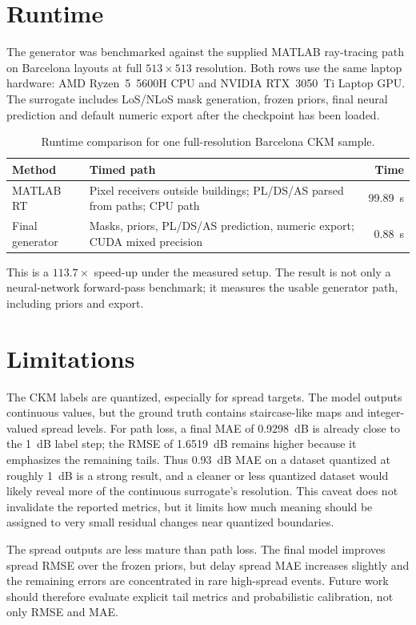\section{Runtime}

The generator was benchmarked against the supplied MATLAB ray-tracing path on
Barcelona layouts at full \(513\times513\) resolution. Both rows use the same
laptop hardware: AMD Ryzen~5~5600H CPU and NVIDIA RTX~3050~Ti Laptop GPU. The
surrogate includes LoS/NLoS mask generation, frozen priors, final neural
prediction and default numeric export after the checkpoint has been loaded.

\begin{table}[htbp]
\centering
\caption{Runtime comparison for one full-resolution Barcelona CKM sample.}
\label{tab:inference_time_comparison}
\scriptsize
\begin{tabularx}{\textwidth}{lXr}
\toprule
Method & Timed path & Time \\
\midrule
MATLAB RT & Pixel receivers outside buildings; PL/DS/AS parsed from paths; CPU path & \SI{99.89}{s} \\
Final generator & Masks, priors, PL/DS/AS prediction, numeric export; CUDA mixed precision & \SI{0.88}{s} \\
\bottomrule
\end{tabularx}
\end{table}

This is a \(113.7\times\) speed-up under the measured setup. The result is not
only a neural-network forward-pass benchmark; it measures the usable generator
path, including priors and export.

\section{Limitations}
\label{sec:limitations}

The CKM labels are quantized, especially for spread targets. The model outputs
continuous values, but the ground truth contains staircase-like maps and
integer-valued spread levels. For path loss, a final MAE of
\SI{0.9298}{dB} is already close to the \SI{1}{dB} label step; the RMSE of
\SI{1.6519}{dB} remains higher because it emphasizes the remaining tails.
Thus \SI{0.93}{dB} MAE on a dataset quantized at roughly \SI{1}{dB} is a
strong result, and a cleaner or less quantized dataset would likely reveal more
of the continuous surrogate's resolution. This caveat does not invalidate the
reported metrics, but it limits how much meaning should be assigned to very
small residual changes near quantized boundaries.

The spread outputs are less mature than path loss. The final model improves
spread RMSE over the frozen priors, but delay spread MAE increases slightly and
the remaining errors are concentrated in rare high-spread events. Future work
should therefore evaluate explicit tail metrics and probabilistic calibration,
not only RMSE and MAE.
